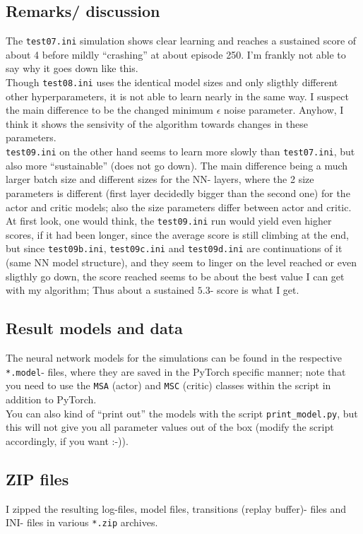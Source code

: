 \documentclass[a4paper]{article}
\begin{document}
\subsection{Remarks/ discussion}
The \texttt{test07.ini} simulation shows clear learning and reaches a sustained
score of about 4 before mildly \enquote{crashing} at about episode 250. I'm frankly
not able to say why it goes down like this.
\\
Though \texttt{test08.ini} uses the identical model sizes and only sligthly
different other hyperparameters, it is not able to learn nearly in the same
way. I suspect the main difference to be the changed minimum $\epsilon$ noise
parameter. Anyhow, I think it shows the sensivity of the algorithm towards
changes in these parameters.
\\
\texttt{test09.ini} on the other hand seems to learn more slowly than
\texttt{test07.ini}, but also more \enquote{sustainable} (does not go down).
The main difference being a much larger batch size and different sizes for
the NN- layers, where the 2 size parameters is different (first layer decidedly
bigger than the second one) for the actor and critic models; also the
size parameters differ between actor and critic.
\\
At first look, one would think, the \texttt{test09.ini} run would yield even
higher scores, if it had been longer, since the average score is still climbing
at the end, but since \texttt{test09b.ini}, \texttt{test09c.ini} and
\texttt{test09d.ini} are continuations of it (same NN model structure), and they
seem to linger on the level reached or even sligthly go down, the score
reached seems to be about the best value I can get with my algorithm;
Thus about a sustained $5.3$- score is what I get.

\subsection{Result models and data}
The neural network models for the simulations can be found in the respective
\texttt{*.model}- files, where they are saved in the PyTorch specific manner;
note that you need to use the \texttt{MSA} (actor) and \texttt{MSC} (critic)
classes within the script in addition to PyTorch.
\\
You can also kind of \enquote{print out} the models with the script
\texttt{print\_model.py}, but this will not give you all parameter values
out of the box (modify the script accordingly, if you want :-)).
\\
\subsection{ZIP files}
I zipped the resulting log-files, model files, transitions (replay buffer)- files
and INI- files in various \texttt{*.zip} archives.
\end{document}

